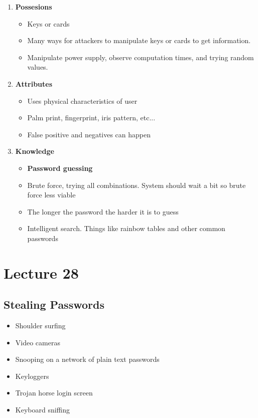 \documentclass{article}
\begin{document}
		\begin{enumerate}
			\item \textbf{Possesions}
			\begin{itemize}
				\item Keys or cards
				\item Many ways for attackers to manipulate keys or cards to get information.
				\item Manipulate power supply, observe computation times, and trying random values.
			\end{itemize}
			
			\item \textbf{Attributes}
			\begin{itemize}
				\item Uses physical characteristics of user
				\item Palm print, fingerprint, iris pattern, etc...
				\item False positive and negatives can happen
			\end{itemize}
			
			\item \textbf{Knowledge}
			\begin{itemize}
				\item \textbf{Password guessing}
				\item Brute force, trying all combinations. System should wait a bit so brute force less viable
				\item The longer the password the harder it is to guess
				\item Intelligent search. Things like rainbow tables and other common passwords
			\end{itemize}
		\end{enumerate}

\section{Lecture 28}	
	\subsection{Stealing Passwords}
		\begin{itemize}
			\item Shoulder surfing
			\item Video cameras
			\item Snooping on a network of plain text passwords
			\item Keyloggers
			\item Trojan horse login screen
			\item Keyboard sniffing
		\end{itemize}
		
\end{document}
